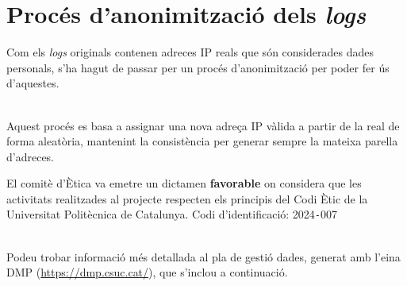 \chapter{Procés d'anonimització dels \textit{\gls{log}s}}\label{ch:log-anonymization}

\noindent
Com els \textit{\gls{log}s} originals contenen adreces \gls{IP} reals que són considerades dades personals, s'ha hagut de passar per un procés d'anonimització per poder fer ús d'aquestes.

\noindent \\
Aquest procés es basa a assignar una nova adreça IP vàlida a partir de la real de forma aleatòria, mantenint la consistència per generar sempre la mateixa parella d'adreces.

\begin{tcolorbox}[colback=green!5!white, colframe=green!50!black, title=Comitè d'Ètica de la UPC]
    El comitè d'Ètica va emetre un dictamen \textbf{favorable} on considera que les activitats realitzades al projecte respecten els principis del Codi Ètic de la Universitat Politècnica de Catalunya\@.
    \tcblower
    Codi d'identificació: 2024\texttt{-}007
\end{tcolorbox}

\noindent \\
Podeu trobar informació més detallada al pla de gestió dades, generat amb l'eina DMP (\url{https://dmp.csuc.cat/}), que s'inclou a continuació.


